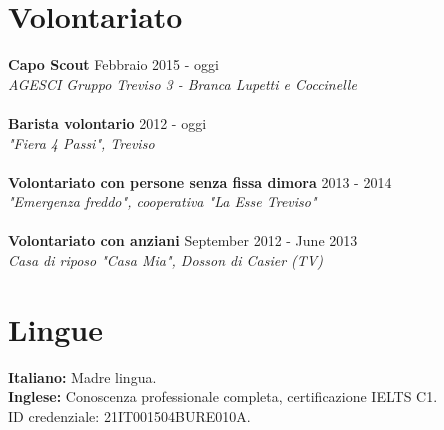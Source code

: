 \documentclass[margin, 10pt]{res}
\begin{document}
\begin{resume}
\section{Volontariato}

\textbf{Capo Scout} \hfill Febbraio 2015 - oggi \\
\textit{AGESCI Gruppo Treviso 3 - Branca Lupetti e Coccinelle} \\ \\
\textbf{Barista volontario} \hfill 2012 - oggi \\
\textit{"Fiera 4 Passi", Treviso} \\ \\
\textbf{Volontariato con persone senza fissa dimora} \hfill 2013 - 2014 \\
\textit{"Emergenza freddo", cooperativa "La Esse Treviso"} \\ \\
\textbf{Volontariato con anziani} \hfill September 2012 - June 2013 \\
\textit{Casa di riposo "Casa Mia", Dosson di Casier (TV)} 





\section{Lingue}
\textbf{Italiano: } Madre lingua. \\
\textbf{Inglese: } Conoscenza professionale completa, certificazione IELTS C1.\\ID credenziale: 21IT001504BURE010A.\\

\end{resume}
\end{document}
